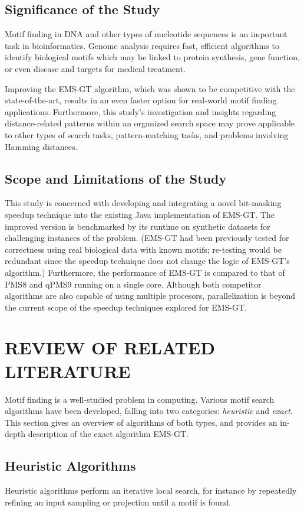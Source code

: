 \documentclass[oneside,12pt]{DISCSthesis}
\begin{document}
	\section{Significance of the Study}
		Motif finding in DNA and other types of nucleotide sequences is an important task in bioinformatics. Genome analysis requires fast, efficient algorithms to identify biological motifs which may be linked to protein synthesis, gene function, or even disease and targets for medical treatment. 

		Improving the EMS-GT algorithm, which was shown to be competitive with the state-of-the-art, results in an even faster option for real-world motif finding applications. Furthermore, this study's investigation and insights regarding distance-related patterns within an organized search space may prove applicable to other types of search tasks, pattern-matching tasks, and problems involving Hamming distances.

	\section{Scope and Limitations of the Study}
		This study is concerned with developing and integrating a novel bit-masking speedup technique into the existing Java implementation of EMS-GT. The improved version is benchmarked by its runtime on synthetic datasets for challenging instances of the problem. (EMS-GT had been previously tested for correctness using real biological data with known motifs; re-testing would be redundant since the speedup technique does not change the logic of EMS-GT's algorithm.)	
		Furthermore, the performance of EMS-GT is compared to that of PMS8 and qPMS9 running on a single core. Although both competitor algorithms are also capable of using multiple procesors, parallelization is beyond the current scope of the speedup techniques explored for EMS-GT.

\chapter{REVIEW OF RELATED LITERATURE}
	Motif finding is a well-studied problem in computing. Various motif search algorithms have been developed,
	falling into two categories: \emph{heuristic} and \emph{exact}. This section gives an overview of algorithms
	of both types, and provides an in-depth description of the exact algorithm EMS-GT.
	
	\section{Heuristic Algorithms}
		Heuristic algorithms perform an iterative local search, for instance by repeatedly refining an input sampling or projection until a motif is found. 
\end{document}
